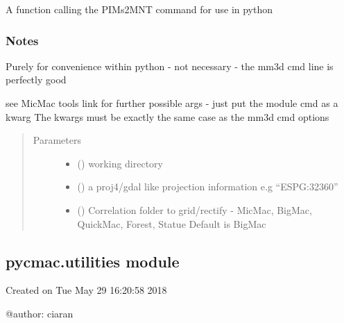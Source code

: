 \documentclass[letterpaper,10pt,english]{sphinxmanual}
\begin{document}
\begin{fulllineitems}
\label{\detokenize{pycmac:dense_match.Tawny}}
A function calling the PIMs2MNT command for use in python
\subsubsection*{Notes}

Purely for convenience within python - not  necessary - the mm3d cmd line
is perfectly good

see MicMac tools link for further possible args - just put the module cmd as a kwarg
The kwargs must be exactly the same case as the mm3d cmd options
\begin{quote}\begin{description}
\item[{Parameters}] \leavevmode\begin{itemize}
\item {} 
 () \textendash{} working directory

\item {} 
 () \textendash{} a proj4/gdal like projection information e.g “ESPG:32360”

\item {} 
 () \textendash{} Correlation folder to grid/rectify - MicMac, BigMac, QuickMac, Forest, Statue
Default is BigMac

\end{itemize}

\end{description}\end{quote}

\end{fulllineitems}



\subsection{pycmac.utilities module}
\label{\detokenize{pycmac:module-utilities}}\label{\detokenize{pycmac:pycmac-utilities-module}}
Created on Tue May 29 16:20:58 2018

@author: ciaran
\end{document}
